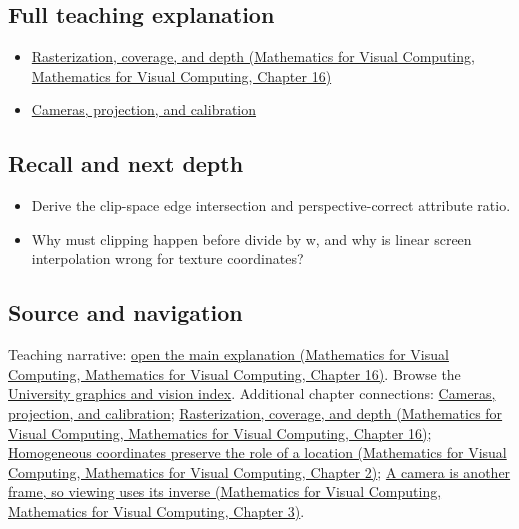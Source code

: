 \subsection{Full teaching explanation}\label{appendix-40426e4b2103-full-teaching-explanation}

\begin{itemize}
\tightlist
\item
  \href{../02-Mathematics-for-Visual-Computing/main.pdf\#nameddest=03-visual-computing-i-ch012-rasterization-coverage-and-depth}{Rasterization, coverage, and depth (Mathematics for Visual Computing, Mathematics for Visual Computing, Chapter 16)}
\item
  \hyperref[03-visual-computing-i-ch003-cameras-projection-and-calibration]{Cameras, projection, and calibration}
\end{itemize}

\subsection{Recall and next depth}\label{appendix-40426e4b2103-recall-and-next-depth}

\begin{itemize}
\tightlist
\item
  Derive the clip-space edge intersection and perspective-correct attribute ratio.
\item
  Why must clipping happen before divide by w, and why is linear screen interpolation wrong for texture coordinates?
\end{itemize}

\subsection{Source and navigation}\label{appendix-40426e4b2103-source-and-navigation}

Teaching narrative: \href{../02-Mathematics-for-Visual-Computing/main.pdf\#nameddest=03-visual-computing-i-ch012-rasterization-coverage-and-depth}{open the main explanation (Mathematics for Visual Computing, Mathematics for Visual Computing, Chapter 16)}. Browse the \hyperref[appendix-a6d556a4ef50-university-graphics-vision-and-photography---independent-series]{University graphics and vision index}. Additional chapter connections: \hyperref[03-visual-computing-i-ch003-cameras-projection-and-calibration]{Cameras, projection, and calibration}; \href{../02-Mathematics-for-Visual-Computing/main.pdf\#nameddest=03-visual-computing-i-ch012-rasterization-coverage-and-depth}{Rasterization, coverage, and depth (Mathematics for Visual Computing, Mathematics for Visual Computing, Chapter 16)}; \href{../02-Mathematics-for-Visual-Computing/main.pdf\#nameddest=01-foundations-i-ch018-homogeneous-coordinates-preserve-the-role-of-a-location}{Homogeneous coordinates preserve the role of a location (Mathematics for Visual Computing, Mathematics for Visual Computing, Chapter 2)}; \href{../02-Mathematics-for-Visual-Computing/main.pdf\#nameddest=01-foundations-i-ch019-a-camera-is-another-frame-so-viewing-uses-its-inverse}{A camera is another frame, so viewing uses its inverse (Mathematics for Visual Computing, Mathematics for Visual Computing, Chapter 3)}.

